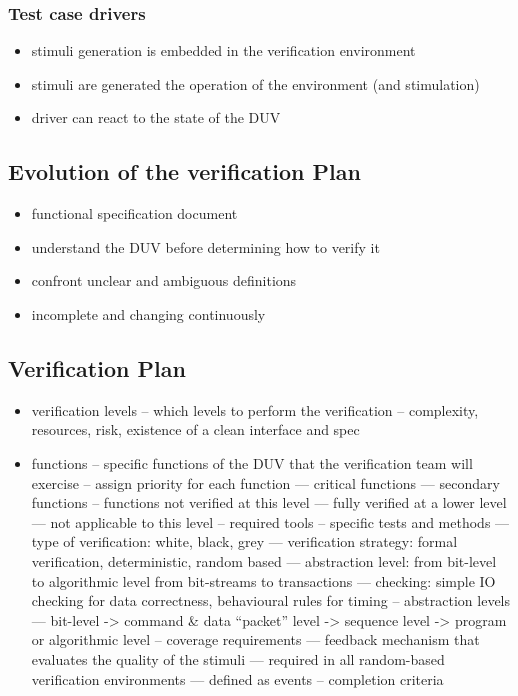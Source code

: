 \documentclass[]{article}
\providecommand{\tightlist}{%
  \setlength{\itemsep}{0pt}\setlength{\parskip}{0pt}}
\begin{document}
\hypertarget{test-case-drivers}{%
\subsubsection{Test case drivers}\label{test-case-drivers}}

\begin{itemize}
\tightlist
\item
  stimuli generation is embedded in the verification environment
\item
  stimuli are generated the operation of the environment (and
  stimulation)
\item
  driver can react to the state of the DUV
\end{itemize}

\hypertarget{evolution-of-the-verification-plan}{%
\subsection{Evolution of the verification
Plan}\label{evolution-of-the-verification-plan}}

\begin{itemize}
\tightlist
\item
  functional specification document
\item
  understand the DUV before determining how to verify it
\item
  confront unclear and ambiguous definitions
\item
  incomplete and changing continuously
\end{itemize}

\hypertarget{verification-plan}{%
\subsection{Verification Plan}\label{verification-plan}}

\begin{itemize}
\tightlist
\item
  verification levels -- which levels to perform the verification --
  complexity, resources, risk, existence of a clean interface and spec
\item
  functions -- specific functions of the DUV that the verification team
  will exercise -- assign priority for each function --- critical
  functions --- secondary functions -- functions not verified at this
  level --- fully verified at a lower level --- not applicable to this
  level -- required tools -- specific tests and methods --- type of
  verification: white, black, grey --- verification strategy: formal
  verification, deterministic, random based --- abstraction level: from
  bit-level to algorithmic level from bit-streams to transactions ---
  checking: simple IO checking for data correctness, behavioural rules
  for timing -- abstraction levels --- bit-level -\textgreater{} command
  \& data ``packet'' level -\textgreater{} sequence level
  -\textgreater{} program or algorithmic level -- coverage requirements
  --- feedback mechanism that evaluates the quality of the stimuli ---
  required in all random-based verification environments --- defined as
  events -- completion criteria
\end{itemize}
\end{document}
